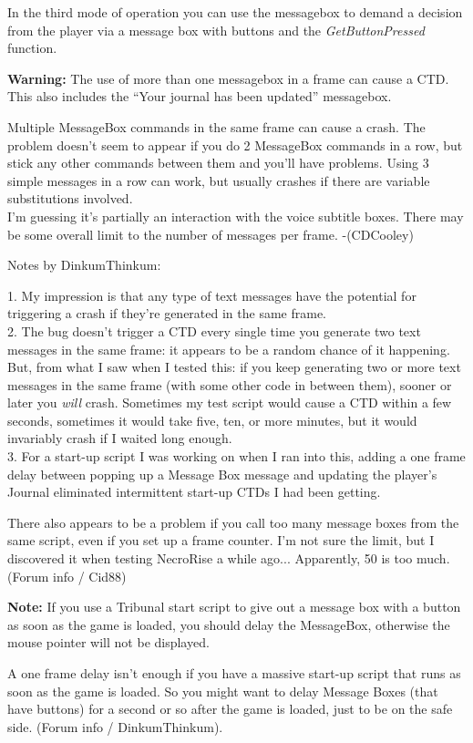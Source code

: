 In the third mode of operation you can use the messagebox to demand a
decision from the player via a message box with buttons and the
\emph{GetButtonPressed} function.

\textbf{Warning:} The use of more than one messagebox in a frame can
cause a CTD. This also includes the ``Your journal has been updated''
messagebox.

Multiple MessageBox commands in the same frame can cause a crash. The
problem doesn't seem to appear if you do 2 MessageBox commands in a row,
but stick any other commands between them and you'll have problems.
Using 3 simple messages in a row can work, but usually crashes if there
are variable substitutions involved.\\
I'm guessing it's partially an interaction with the voice subtitle
boxes. There may be some overall limit to the number of messages per
frame. -(CDCooley)

Notes by DinkumThinkum:

1. My impression is that any type of text messages have the potential
for triggering a crash if they're generated in the same frame.\\
2. The bug doesn't trigger a CTD every single time you generate two text
messages in the same frame: it appears to be a random chance of it
happening. But, from what I saw when I tested this: if you keep
generating two or more text messages in the same frame (with some other
code in between them), sooner or later you \emph{will} crash. Sometimes
my test script would cause a CTD within a few seconds, sometimes it
would take five, ten, or more minutes, but it would invariably crash if
I waited long enough.\\
3. For a start-up script I was working on when I ran into this, adding a
one frame delay between popping up a Message Box message and updating
the player's Journal eliminated intermittent start-up CTDs I had been
getting.

There also appears to be a problem if you call too many message boxes
from the same script, even if you set up a frame counter. I'm not sure
the limit, but I discovered it when testing NecroRise a while ago...
Apparently, 50 is too much. (Forum info / Cid88)

\textbf{Note:} If you use a Tribunal start script to give out a message
box with a button as soon as the game is loaded, you should delay the
MessageBox, otherwise the mouse pointer will not be displayed.

A one frame delay isn't enough if you have a massive start-up script
that runs as soon as the game is loaded. So you might want to delay
Message Boxes (that have buttons) for a second or so after the game is
loaded, just to be on the safe side. (Forum info / DinkumThinkum).

